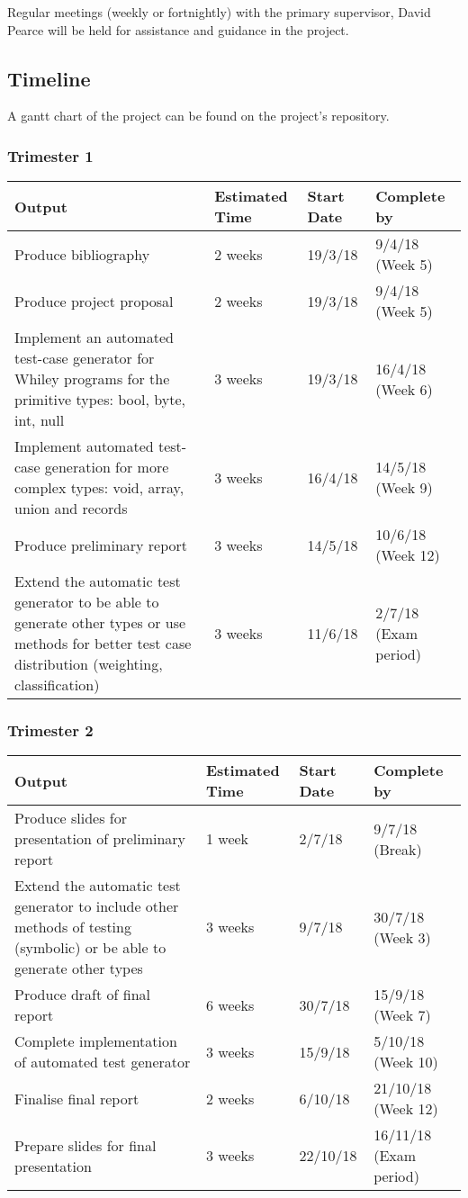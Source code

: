 \documentclass[11pt, a4paper, oneside, openright]{report}
\begin{document}
Regular meetings (weekly or fortnightly) with the primary supervisor, David Pearce will be held for assistance and guidance in the project.

\subsection*{Timeline}
A gantt chart of the project can be found on the project's repository.
\subsubsection*{Trimester 1}
\begin{tabular}{ |p{10cm}|p{2cm}|p{2cm}|p{2cm}| }
	\hline
	\textbf{Output} & \textbf{Estimated Time} &
	\textbf{Start Date} & \textbf{Complete by}\\
	\hline
	Produce bibliography & 2 weeks & 19/3/18
	& 9/4/18 (Week 5) \\
	\hline
	Produce project proposal & 2 weeks & 19/3/18 & 9/4/18 (Week 5) \\
	\hline
	Implement an automated test-case generator for Whiley programs for the primitive types: bool, byte, int, null & 3 weeks & 19/3/18 & 16/4/18 (Week 6) \\
	
	\hline
	Implement automated test-case generation for more complex types: void, array, union and records & 3 weeks & 16/4/18 & 14/5/18 (Week 9) \\
	\hline
	Produce preliminary report & 3 weeks & 14/5/18 & 10/6/18 (Week 12) \\	
	\hline
	Extend the automatic test generator to be able to generate other types or use methods for better test case distribution (weighting, classification) & 3 weeks & 11/6/18 & 2/7/18 (Exam period) \\
	\hline
\end{tabular}

\subsubsection*{Trimester 2}
\begin{tabular}{ |p{10cm}|p{2cm}|p{2cm}|p{2cm}| }
	\hline
	\textbf{Output} & \textbf{Estimated Time} & \textbf{Start Date} & \textbf{Complete by}\\
	\hline
	Produce slides for presentation of preliminary report & 1 week & 2/7/18 & 9/7/18 (Break)\\
	\hline
	Extend the automatic test generator to include other methods of testing (symbolic) or be able to generate other types & 3 weeks & 9/7/18 & 30/7/18 (Week 3)\\
	\hline
	Produce draft of final report & 6 weeks & 30/7/18 & 15/9/18 (Week 7)\\
	\hline
	Complete implementation of automated test generator & 3 weeks & 15/9/18 & 5/10/18 (Week 10) \\
	\hline
	Finalise final report & 2 weeks & 6/10/18 & 21/10/18 (Week 12) \\
	\hline
	Prepare slides for final presentation & 3 weeks & 22/10/18 & 16/11/18 (Exam period)\\
	\hline
\end{tabular}
\end{document}
